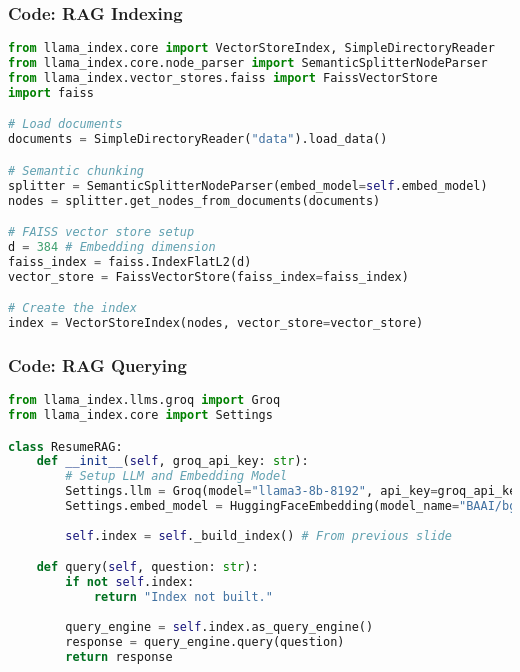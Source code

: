 \begin{frame}[fragile]\frametitle{Code: RAG Indexing}
    \begin{lstlisting}[language=Python, caption={llm\_llamaindex\_rag.py - Building the Index}]
from llama_index.core import VectorStoreIndex, SimpleDirectoryReader
from llama_index.core.node_parser import SemanticSplitterNodeParser
from llama_index.vector_stores.faiss import FaissVectorStore
import faiss

# Load documents
documents = SimpleDirectoryReader("data").load_data()

# Semantic chunking
splitter = SemanticSplitterNodeParser(embed_model=self.embed_model)
nodes = splitter.get_nodes_from_documents(documents)

# FAISS vector store setup
d = 384 # Embedding dimension
faiss_index = faiss.IndexFlatL2(d)
vector_store = FaissVectorStore(faiss_index=faiss_index)

# Create the index
index = VectorStoreIndex(nodes, vector_store=vector_store)
    \end{lstlisting}
\end{frame}

\begin{frame}[fragile]\frametitle{Code: RAG Querying}
    \begin{lstlisting}[language=Python, caption={llm\_llamaindex\_rag.py - Querying}]
from llama_index.llms.groq import Groq
from llama_index.core import Settings

class ResumeRAG:
    def __init__(self, groq_api_key: str):
        # Setup LLM and Embedding Model
        Settings.llm = Groq(model="llama3-8b-8192", api_key=groq_api_key)
        Settings.embed_model = HuggingFaceEmbedding(model_name="BAAI/bge-small-en-v1.5")
        
        self.index = self._build_index() # From previous slide

    def query(self, question: str):
        if not self.index:
            return "Index not built."
            
        query_engine = self.index.as_query_engine()
        response = query_engine.query(question)
        return response
    \end{lstlisting}
\end{frame}

